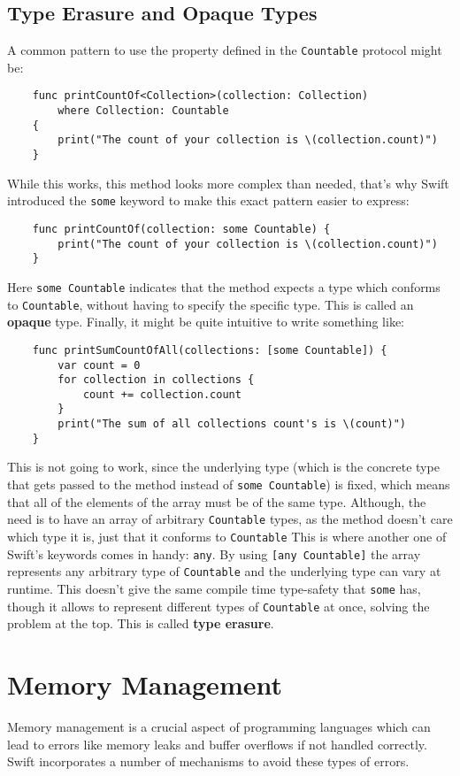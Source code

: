 \subsection{Type Erasure and Opaque Types}
A common pattern to use the property defined in the \lstinline{Countable} protocol might be:
\begin{verbatim}
    func printCountOf<Collection>(collection: Collection) 
        where Collection: Countable 
    {
        print("The count of your collection is \(collection.count)")
    }
\end{verbatim}
While this works, this method looks more complex than needed, that's why Swift introduced the \lstinline{some} keyword to make this exact pattern easier to express:
\begin{verbatim}
    func printCountOf(collection: some Countable) {
        print("The count of your collection is \(collection.count)")
    }
\end{verbatim}
Here \lstinline{some Countable} indicates that the method expects a type which conforms to \lstinline{Countable}, without having to specify the specific type. This is called an \textbf{opaque} type.
Finally, it might be quite intuitive to write something like:
\begin{verbatim}
    func printSumCountOfAll(collections: [some Countable]) {
        var count = 0
        for collection in collections {
            count += collection.count
        }
        print("The sum of all collections count's is \(count)")
    }
\end{verbatim}
This is not going to work, since the underlying type (which is the concrete type that gets passed to the method instead of \lstinline{some Countable}) is fixed, which means that all of the elements of the array must be of the same type. Although, the need is to have an array of arbitrary \lstinline{Countable} types, as the method doesn't care which type it is, just that it conforms to \lstinline{Countable}
This is where another one of Swift's keywords comes in handy: \lstinline{any}. By using \lstinline{[any Countable]} the array represents any arbitrary type of \lstinline{Countable} and the underlying type can vary at runtime. This doesn't give the same compile time type-safety that \lstinline{some} has, though it allows to represent different types of \lstinline{Countable} at once, solving the problem at the top. This is called \textbf{type erasure}.


\section{Memory Management}
Memory management is a crucial aspect of programming languages which can lead to errors like memory leaks and buffer overflows if not handled correctly. Swift incorporates a number of mechanisms to avoid these types of errors.

